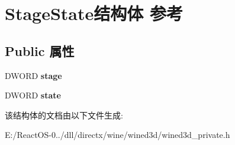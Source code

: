 \hypertarget{struct_stage_state}{}\section{Stage\+State结构体 参考}
\label{struct_stage_state}
\subsection*{Public 属性}
\begin{DoxyCompactItemize}
\item 
\mbox{\label{struct_stage_state_a0323f29a44a736b2a16f7a5dbacb637f}} 
D\+W\+O\+RD {\bfseries stage}
\item 
\mbox{\label{struct_stage_state_a55c231507339b02ded036fa6216e2697}} 
D\+W\+O\+RD {\bfseries state}
\end{DoxyCompactItemize}


该结构体的文档由以下文件生成\+:\begin{DoxyCompactItemize}
\item 
E\+:/\+React\+O\+S-\/0../dll/directx/wine/wined3d/wined3d\+\_\+private.\+h\end{DoxyCompactItemize}

